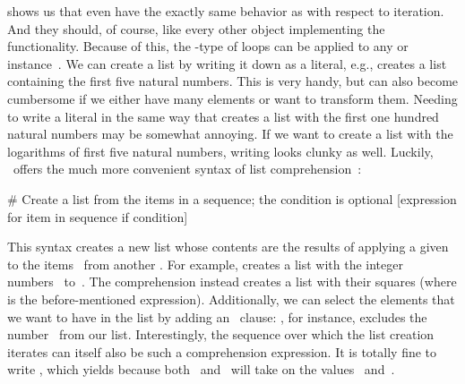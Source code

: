  shows us that even  have the exactly same behavior as  with respect to iteration.
And they should, of course, like every other object implementing the~ functionality.
Because of this, the -type of loops can be applied to any  or  instance~.%
%
\endhsection%
%
%
\label{sec:listComprehension}%
%
We can create a list by writing it down as a literal, e.g., \pythonil{[1, 2, 3, 4, 5]} creates a list containing the first five natural numbers.
This is very handy, but can also become cumbersome if we either have many elements or want to transform them.
Needing to write a literal in the same way that creates a list with the first one hundred natural numbers may be somewhat annoying.
If we want to create a list with the logarithms of first five natural numbers, writing  looks clunky as well.
Luckily, \python\ offers the much more convenient syntax of list comprehension~\cite{PEP202}:%
%
\begin{pythonSyntax}
# Create a list from the items in a sequence; the condition is optional
[expression for item in sequence if condition]
\end{pythonSyntax}
%
%
%
%
%
\begin{sloppypar}%
This syntax creates a new list whose contents are the results of applying a given  to the items~ from another .
For example,  creates a list with the integer numbers~ to~.
The comprehension  instead creates a list with their squares (where  is the before-mentioned expression).
Additionally, we can select the elements that we want to have in the list by adding an ~clause:
\pythonil{[i for i in range(10) if i != 3]}, for instance, excludes the number~ from our list.
Interestingly, the sequence over which the list creation iterates can itself also be such a comprehension expression.
It is totally fine to write , which yields \pythonil{[0, 0, 0, 1]} because both~ and~ will take on the values~ and~.%
\end{sloppypar}%

